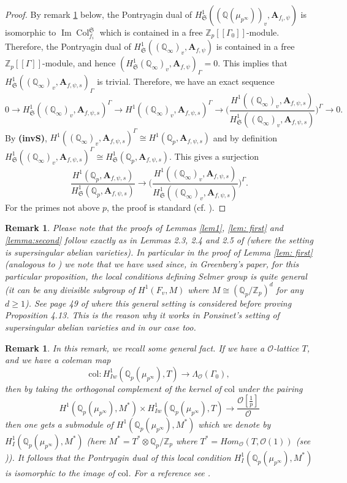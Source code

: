 \documentclass{amsart}
\renewcommand{\geq}{\geqslant}
\newcommand{\Q}{\mathbb{Q}}
\newcommand{\Z}{\mathbb{Z}}
\newcommand{\fS}{\mathfrak{S}}
\newcommand{\bA}{\mathbf{A}}
\newcommand{\col}{\operatorname{Col}}
\newcommand{\im}{\operatorname{Im}}
\newtheorem{auxiliary proposition}[theorem]{Auxiliary Proposition}
\newtheorem{main conjecture}[theorem]{Main Conjecture}
\newtheorem{main theorem}[theorem]{Main Theorem}
\newtheorem{modesty proposition}[theorem]{Modesty Proposition}
\newtheorem{open problem}[theorem]{Open Problem}
\newtheorem{remark}[theorem]{Remark}
\newtheorem{convergence lemma}[theorem]{Convergence Lemma}
\newtheorem{corrected lemma}[theorem]{Corrected Lemma}
\newtheorem{growth lemma}[theorem]{Growth Lemma}
\newtheorem{coefficient lemma}[theorem]{Integrality Lemma}
\newtheorem{interpolation lemma}[theorem]{Interpolation Lemma}
\newtheorem{kernel lemma}[theorem]{Kernel Lemma}
\newtheorem{limit lemma}[theorem]{Limit Lemma}
\newtheorem{tandem lemma}[theorem]{Modesty Lemma}
\newtheorem{zero-finding lemma}[theorem]{Zero-Finding Lemma}
\begin{document}
\begin{proof}
By remark \ref{rem:gen} below, the Pontryagin dual of $H^1_{\fS}((\Q(\mu_{p^\infty}))_v,\bA_{f_i, \psi})$ is isomorphic to $\im \col_{f_i}^{\fS}$ which is contained in a free $\Z_p[[\Gamma_0]]$-module.
Therefore, the Pontryagin dual of 
   $H^1_{\fS}((\Q_\infty)_v,\bA_{f, \psi})$ is contained in a free $\Z_p[[\Gamma]]$-module,
   and hence $(H^1_{\fS}(\Q_\infty)_v,\bA_{f, \psi})_{\Gamma}=0$. This   implies that  $H^1_{\fS}((\Q_\infty)_v,\bA_{f, \psi,s})_{\Gamma}$ is trivial. 
   Therefore, we have an exact sequence
   $$0 \rightarrow H^1_{\fS}((\Q_\infty)_v,\bA_{f, \psi,s})^{\Gamma} \rightarrow H^1((\Q_\infty)_v,\bA_{f, \psi,s})^{\Gamma} \rightarrow \Big(\frac{H^1((\Q_\infty)_v,\bA_{f, \psi,s})}{H^1_{\fS}((\Q_\infty)_v,\bA_{f, \psi,s})}\Big)^{\Gamma} \rightarrow 0.$$
   By \textbf{(invS)}, $H^1((\Q_\infty)_v,\bA_{f, \psi,s})^{\Gamma} \cong H^1(\Q_p,\bA_{f, \psi,s})$ and by definition $ H^1_{\fS}((\Q_\infty)_v,\bA_{f, \psi,s})^{\Gamma} \cong H^1_{\fS}(\Q_p,\bA_{f, \psi,s})$. This gives a surjection
   $$\frac{H^1(\Q_p,\bA_{f, \psi,s})}{H^1_{\fS}(\Q_p,\bA_{f, \psi,s})}\rightarrow \Big(\frac{H^1((\Q_\infty)_v,\bA_{f, \psi,s})}{H^1_{\fS}((\Q_\infty)_v,\bA_{f, \psi,s})}\Big)^{\Gamma}.$$
   For the primes not above $p$, the proof is standard (cf. \cite[Lemma 2.5]{ponsinet}).   
\end{proof}
\begin{remark}
    Please note that the proofs of Lemmas \ref{lem1}, \ref{lem: first} and \ref{lemma:second} follow exactly as in Lemmas 2.3, 2.4 and 2.5 of \cite{ponsinet} (where the setting is supersingular abelian varieties). In particular in the proof of Lemma \ref{lem: first} (analogous to \cite[Lemma 2.4]{ponsinet}) we note that we have used \cite[Proposition 4.13]{Greenberg} since, in Greenberg's paper, for this particular proposition, the local conditions defining Selmer group is quite general (it can be any divisible subgroup of $H^1(F_v,M)$ where $M \cong (\Q_p/\Z_p)^d$ for any $d \geq 1$). See page 49 of \cite{Greenberg} where this general setting is considered before proving Proposition 4.13. This is the reason why it works in Ponsinet's setting of supersingular abelian varieties and in our case too. 
\end{remark}
\begin{remark}\label{rem:gen} In this remark, we recall some general fact.
    If we have a $\mathcal{O}$-lattice  $T$, and we have a coleman map $$\mathrm{col}: H^1_{Iw}(\Q_p(\mu_{p^\infty}), T) \rightarrow \Lambda_{\mathcal{O}}(\Gamma_0),$$ then by taking the orthogonal complement of the kernel of $\mathrm{col}$ under the  pairing $$H^1(\Q_p(\mu_{p^\infty}), M^*) \times H^1_{Iw}(\Q_p(\mu_{p^\infty}), T) \rightarrow \frac{\mathcal{O}[\frac{1}{p}]}{\mathcal{O}} $$
then one gets a submodule  of $H^1(\Q_p(\mu_{p^\infty}), M^*)$ which we denote by $H^1_I(\Q_p(\mu_{p^\infty}), M^*)$ (here $M^*=T^* \otimes \Q_p/\Z_p$ where  $T^*= Hom_{\mathcal{O}}(T, \mathcal{O}(1))$ (see \cite[Section 1.6]{ponsinet})). It follows that the Pontryagin dual of this local condition $H^1_I(\Q_p(\mu_{p^\infty}), M^*)$ is isomorphic to the image of $\mathrm{col}$. For a reference see \cite[p. 1276, line 4, or Remark 4.2]{HatleyLei19}.
\end{remark}
\end{document}
